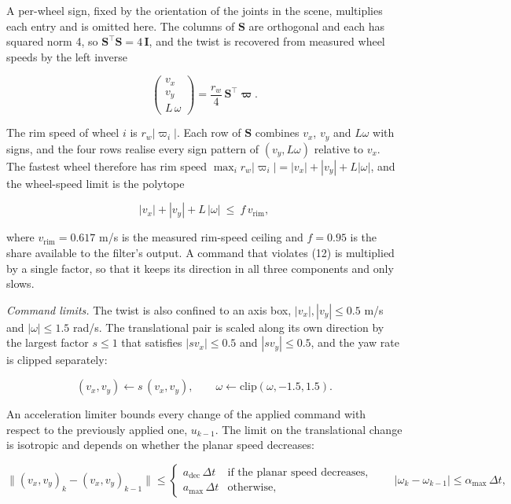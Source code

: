 A per-wheel sign, fixed by the orientation of the joints in the scene, multiplies each entry and is omitted here. The columns of $\mathbf{S}$ are orthogonal and each has squared norm 4, so $\mathbf{S}^{\top}\mathbf{S} = 4\,\mathbf{I}$, and the twist is recovered from measured wheel speeds by the left inverse

\begin{equation*}
\begin{pmatrix} v_x \\ v_y \\ L\,\omega \end{pmatrix} = \frac{r_w}{4}\, \mathbf{S}^{\top} \boldsymbol{\varpi}.
\tag{11}
\end{equation*}

The rim speed of wheel $i$ is $r_w|\varpi_i|$. Each row of $\mathbf{S}$ combines $v_x$, $v_y$ and $L\omega$ with signs, and the four rows realise every sign pattern of $(v_y, L\omega)$ relative to $v_x$. The fastest wheel therefore has rim speed $\max_i r_w|\varpi_i| = |v_x| + |v_y| + L|\omega|$, and the wheel-speed limit is the polytope

\begin{equation*}
|v_x| + |v_y| + L\,|\omega| \ \le\ f\, v_{\mathrm{rim}},
\tag{12}
\end{equation*}

where $v_{\mathrm{rim}} = 0.617$ m/s is the measured rim-speed ceiling and $f = 0.95$ is the share available to the filter's output. A command that violates (12) is multiplied by a single factor, so that it keeps its direction in all three components and only slows.

\emph{Command limits.} The twist is also confined to an axis box, $|v_x|, |v_y| \le 0.5$ m/s and $|\omega| \le 1.5$ rad/s. The translational pair is scaled along its own direction by the largest factor $s \le 1$ that satisfies $|s v_x| \le 0.5$ and $|s v_y| \le 0.5$, and the yaw rate is clipped separately:

\begin{equation*}
(v_x, v_y) \leftarrow s\,(v_x, v_y), \qquad \omega \leftarrow \mathrm{clip}(\omega, -1.5, 1.5).
\tag{13}
\end{equation*}

An acceleration limiter bounds every change of the applied command with respect to the previously applied one, $u_{k-1}$. The limit on the translational change is isotropic and depends on whether the planar speed decreases:

\begin{equation*}
\big\|(v_x, v_y)_k - (v_x, v_y)_{k-1}\big\| \le
\begin{cases}
a_{\mathrm{dec}}\,\Delta t & \text{if the planar speed decreases},\\
a_{\max}\,\Delta t & \text{otherwise},
\end{cases}
\qquad |\omega_k - \omega_{k-1}| \le \alpha_{\max}\,\Delta t,
\tag{14}
\end{equation*}

